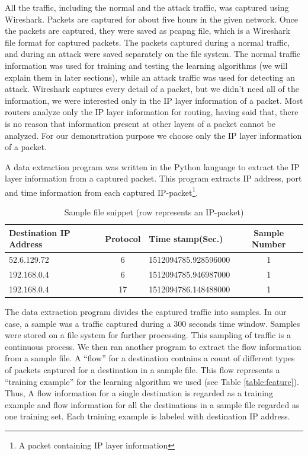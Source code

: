 \documentclass[12pt,oneside,a4paper]{article}
\begin{document}
All the traffic, including the normal and the attack traffic, was captured using Wireshark. Packets are captured for about five hours in the given network. Once the packets are captured, they were saved as pcapng file, which is a Wireshark file format for captured packets. The packets captured during a normal traffic, and during an attack were saved separately on the file system. The normal traffic information was used for training and testing the learning algorithms (we will explain them in later sections), while an attack traffic was used for detecting an attack. Wireshark captures every detail of a packet, but we didn't need all of the information, we were interested only in the IP layer information of a packet. Most routers analyze only the IP layer information for routing, having said that, there is no reason that information present at other layers of a packet cannot be analyzed. For our demonstration purpose we choose only the IP layer information of a packet.\par

A data extraction program was written in the Python language to extract the IP layer information from a captured packet. This program extracts IP address, port and time information from each captured IP-packet\footnote{A packet containing IP layer information}.

\begin{table}[H]
\centering
  \begin{tabular}{| l | c | l | c |}
    \hline
    Destination IP Address      & Protocol  & Time stamp(Sec.)  & Sample Number \\
    \hline
    52.6.129.72         & 6         & 1512094785.928596000  & 1 \\ \hline
    192.168.0.4         & 6         & 1512094785.946987000  & 1 \\ \hline
    192.168.0.4         & 17        & 1512094786.148488000  & 1 \\ \hline
  \end{tabular}
\caption{Sample file snippet (row represents an IP-packet)} \label{table:sample-file-snippet}
\end{table}

The data extraction program divides the captured traffic into samples. In our case, a sample was a traffic captured during a 300 seconds time window. Samples were stored on a file system for further processing. This sampling of traffic is a continuous process. We then ran another program to extract the flow information from a sample file. A ``flow'' for a destination contains a count of different types of packets captured for a destination in a sample file. This flow represents a ``training example'' for the learning algorithm we used (see Table \ref{table:feature}). Thus, A flow information for a single destination is regarded as a training example and flow information for all the destinations in a sample file regarded as one training set. Each training example is labeled with destination IP address.
\end{document}
